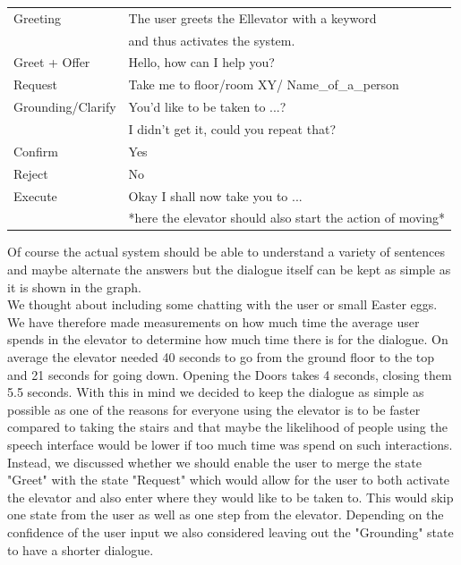 \documentclass[a4paper, 12pt]{article}
\begin{document}
\begin{tabular}{|ll|}
  \hline
  Greeting & The user greets the Ellevator with a keyword \\
    & and thus activates the system.  \\
  Greet + Offer & Hello, how can I help you? \\
  Request & Take me to floor/room XY/ Name\_of\_a\_person \\
  Grounding/Clarify & You'd like to be taken to ...?\\ 
   & I didn't get it, could you repeat that? \\
  Confirm & Yes \\
  Reject & No \\
  Execute & Okay I shall now take you to ... \\ 
   & *here the elevator should also start the action of moving* \\
  \hline 
\end{tabular}
\newline
Of course the actual system should be able to understand a variety of sentences and maybe alternate the answers but the dialogue itself can be kept as simple as it is shown in the graph.  \\

We thought about including some chatting with the user or small Easter eggs. 
We have therefore made measurements on how much time the average user spends in the elevator to determine how much time there is for the dialogue.
On average the elevator needed 40 seconds to go from the ground floor to the top and 21 seconds for going down. Opening the Doors takes 4 seconds, closing them 5.5 seconds.
With this in mind we decided to keep the dialogue as simple as possible as one of the reasons for everyone using the elevator is to be faster compared to taking the stairs and that maybe the likelihood of people using the speech interface would be lower if too much time was spend on such interactions.\\

Instead, we discussed whether we should enable the user to merge the state "Greet" with the state "Request" which would allow for the user to both activate the elevator and also enter where they would like to be taken to.
This would skip one state from the user as well as one step from the elevator.
Depending on the confidence of the user input we also considered leaving out the "Grounding" state to have a shorter dialogue.\\
\end{document}
